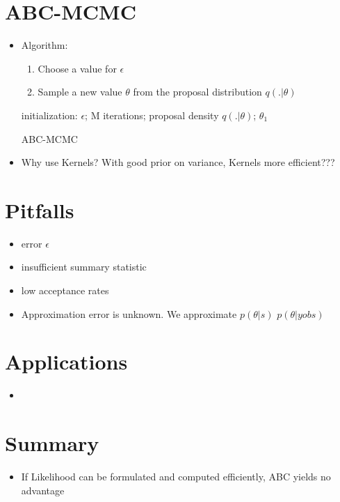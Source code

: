 \documentclass[10pt,a4paper]{report}
\begin{document}
\chapter{ABC-MCMC}
\begin{itemize}
\item Algorithm:
\begin{enumerate}
\item Choose a value for $\epsilon$
\item Sample a new value $\theta$ from the proposal distribution $q(.|\theta)$
\end{enumerate}
\begin{algorithm}[H]
\SetAlgoLined
{}
 initialization: $\epsilon$; M iterations; proposal density $q(.|\theta)$; $\theta_1$ \\
 \caption{ABC-MCMC}
\end{algorithm}

\item Why use Kernels? With good prior on variance, Kernels more efficient???
\end{itemize}

\chapter{Pitfalls}
\begin{itemize}
\item error $\epsilon$
\item insufficient summary statistic
\item low acceptance rates
\item Approximation error is unknown. We approximate $p(\theta|s)$ $p(\theta|y{obs})$
\end{itemize}

\chapter{Applications}
\begin{itemize}
\item
\end{itemize}

\chapter{Summary}
\begin{itemize}
\item If Likelihood can be formulated and computed efficiently, ABC yields no advantage
\end{itemize}
\end{document}
